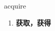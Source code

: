 
\begin{frame}
{\huge acquire}
\begin{center}
\begin{enumerate}\Large
  \item \textbf{获取，获得}
\end{enumerate}
\end{center}
\end{frame}
